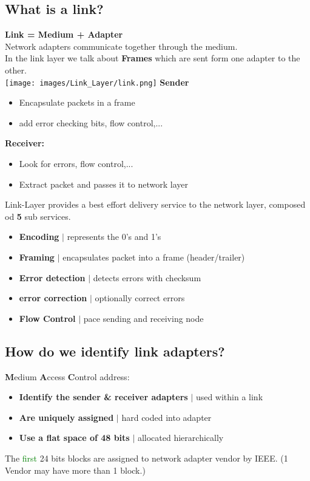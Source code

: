 \documentclass[a4paper, fontsize=8pt, landscape, DIV=1]{scrartcl}
\begin{document}
\begin{multicols*}{4}
		\subsection{What is a link?}
		\textbf{Link =  Medium + Adapter}\\
		Network adapters communicate together through the medium.\\
		In the link layer we talk about \textbf{Frames} which are sent form one
		adapter to the other.\\
		\texttt{[image: images/Link\_Layer/link.png]} 
		\textbf{Sender}
		\vspace{-0.3cm}
		\begin{itemize}[noitemsep]
			\item Encapsulate packets in a frame
			\item add error checking bits, flow control,...
		\end{itemize}
		\textbf{Receiver:}
		\vspace{-0.3cm}
		\begin{itemize}[noitemsep]
			\item Look for errors, flow control,...
			\item Extract packet and passes it to network layer 
		\end{itemize}
		Link-Layer provides a best effort delivery service to the network layer,
		composed od \textbf{5} sub services.
		\begin{itemize}[noitemsep]
			\item \textbf{Encoding} $\vert$ represents the 0's and 1's
			\item \textbf{Framing} $\vert$ encapsulates packet into a frame
			(header/trailer)
			\item \textbf{Error detection} $\vert$ detects errors with checksum
			\item \textbf{error correction} $\vert$ optionally correct errors
			\item \textbf{Flow Control} $\vert$ pace sending and receiving node 
		\end{itemize} 
		
		\subsection{How do we identify link adapters?}
		\textbf{M}edium \textbf{A}ccess \textbf{C}ontrol address:
		\vspace{-0.2cm}
		\begin{itemize}[noitemsep]
			\item \textbf{Identify the sender \& receiver adapters} $\vert$ used
			within a link
			\item \textbf{Are uniquely assigned} $\vert$ hard coded into adapter
			\item \textbf{Use a flat space of 48 bits} $\vert$ allocated
			hierarchically 
		\end{itemize}
		The \textcolor{Green}{first} 24 bits blocks are assigned to network
		adapter vendor by IEEE. (1 Vendor may have more than 1 block.)
		

\end{multicols*}
\end{document}
